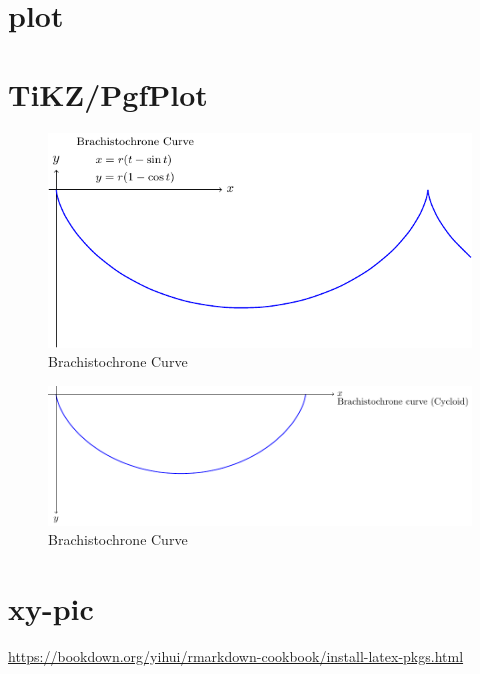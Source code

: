 \documentclass[
]{book}
\theoremstyle{definition}
\theoremstyle{definition}
\theoremstyle{definition}
\theoremstyle{definition}
\theoremstyle{remark}
\begin{document}
\hypertarget{plot}{%
\chapter{plot}\label{plot}}

\hypertarget{tikzpgfplot}{%
\chapter*{TiKZ/PgfPlot}\label{tikzpgfplot}}

\begin{figure}
\includegraphics[width=0.9\linewidth]{202401260003-plot_files/figure-latex/unnamed-chunk-3-1} \caption{Brachistochrone Curve}\label{fig:unnamed-chunk-3}
\end{figure}

\begin{figure}
\includegraphics[width=0.9\linewidth]{202401260003-plot_files/figure-latex/unnamed-chunk-4-1} \caption{Brachistochrone Curve}\label{fig:unnamed-chunk-4}
\end{figure}

\hypertarget{xy-pic}{%
\chapter*{xy-pic}\label{xy-pic}}

\url{https://bookdown.org/yihui/rmarkdown-cookbook/install-latex-pkgs.html}
\end{document}
